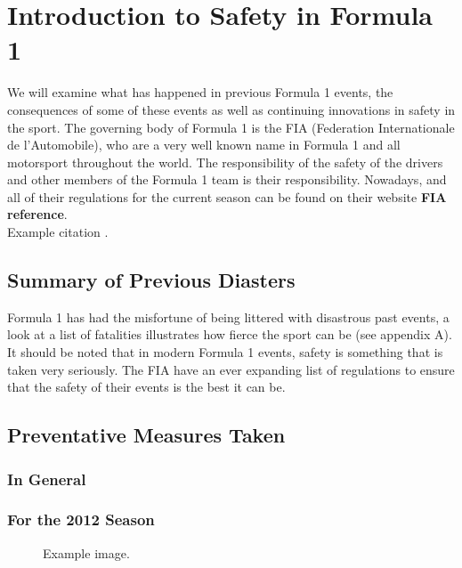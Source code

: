 \documentclass[12pt]{article} %
\begin{document}
\section{Introduction to Safety in Formula 1} %

We will examine what has happened in previous Formula 1 events, the consequences of some of these events as well as
continuing innovations in safety in the sport. The governing body of Formula 1 is the FIA (Federation Internationale de l'Automobile), who are a very well known name in Formula 1 and all motorsport throughout the world. The responsibility of the safety of the drivers and other members of the Formula 1 team is their responsibility. Nowadays, and all of their regulations for the current season can be found on their website {\bf FIA reference}.\\
Example citation \cite{Figueredo:2009dg}.\\


\subsection{Summary of Previous Diasters} %

Formula 1 has had the misfortune of being littered with disastrous past events, a look at a list of fatalities illustrates how fierce the sport can be (see appendix A). It should be noted that in modern Formula 1 events, safety is something that is taken very seriously. The FIA have an ever expanding list of regulations to ensure that the safety of their events is the best it can be.


\subsection{Preventative Measures Taken} %
\subsubsection{In General}
\subsubsection{For the 2012 Season}

\begin{figure}[H] %
\caption{Example image.}
\label{fig:speciation}
\end{figure}
\end{document}
